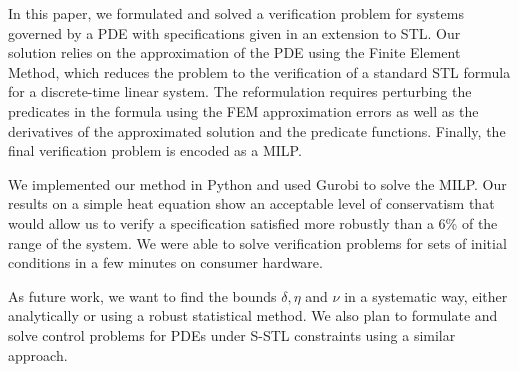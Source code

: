\documentclass[letterpaper, 10 pt, conference]{ieeeconf/ieeeconf}
\begin{document}
In this paper, we formulated and solved a verification problem for systems governed by a
PDE with specifications given in an extension to STL. Our solution relies
on the approximation of the PDE using the Finite Element Method, which reduces
the problem to the verification of a standard STL formula for a discrete-time
linear system. The reformulation requires perturbing the predicates in the
formula using the FEM approximation errors as well as the derivatives of the
approximated solution and the predicate functions. Finally, the final
verification problem is encoded as a MILP.

We implemented our method in Python and used Gurobi to solve the MILP. Our
results on a simple heat equation show an acceptable level of conservatism that
would allow us to verify a specification satisfied more robustly than a 6\% of the range of
the system. We were able to solve verification problems for sets of initial conditions in a
few minutes on consumer hardware.

As future work, we want to find the bounds $\delta, \eta$ and $\nu$ in a
systematic way, either analytically or using a robust statistical method. We
also plan to formulate and solve control problems for PDEs under S-STL constraints
using a similar approach.



\end{document}
